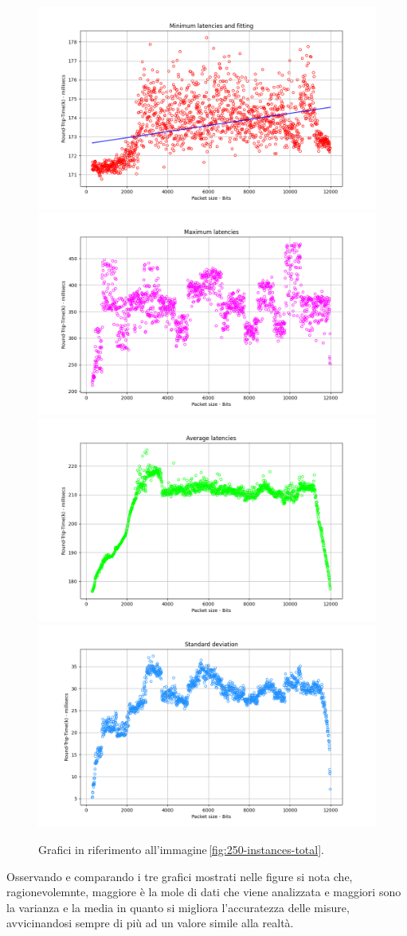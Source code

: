 \begin{figure}[h]
    \centering
    \includegraphics[width = .49\textwidth]{hw-2/report/imgs/250-instances/la-min-latencies.png}
    \includegraphics[width = .49\textwidth]{hw-2/report/imgs/250-instances/la-max-latencies.png}
    \includegraphics[width = .49\textwidth]{hw-2/report/imgs/250-instances/la-avg-latencies.png}
    \includegraphics[width = .49\textwidth]{hw-2/report/imgs/250-instances/la-standard-deviation.png}
    \caption{Grafici in riferimento all'immagine\,\ref{fig:250-instances-total}.}
    \label{fig:250-instances-stats}
\end{figure}

\FloatBarrier\noindent Osservando e comparando i tre grafici mostrati nelle figure si nota che, ragionevolemnte, maggiore è la mole di dati che viene analizzata e maggiori sono la varianza e la media in quanto si migliora l'accuratezza delle misure, avvicinandosi sempre di più ad un valore simile alla realtà.

